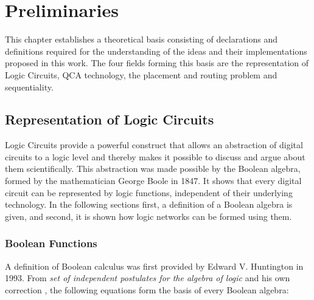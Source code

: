 \chapter{Preliminaries}\label{chapter:Preliminaries}
This chapter establishes a theoretical basis consisting of declarations and definitions required for the understanding of the ideas and their implementations proposed in this work. The four fields forming this basis are the representation of Logic Circuits, QCA technology, the placement and routing problem and sequentiality.

\section{Representation of Logic Circuits}
Logic Circuits provide a powerful construct that allows an abstraction of digital circuits to a logic level and thereby makes it possible to discuss and argue about them scientifically. This abstraction was made possible by the Boolean algebra, formed by the mathematician George Boole in 1847. It shows that every digital circuit can be represented by logic functions, independent of their underlying technology. In the following sections first, a definition of a Boolean algebra is given, and second, it is shown how logic networks can be formed using them.

\subsection{Boolean Functions}\label{subsec:boolfunc}
A definition of Boolean calculus was first provided by Edward V. Huntington in 1993. From \textit{set of independent postulates for the algebra of logic} and his own correction \cite{HuntingtonPostulate, HuntingtonCorrection}, the following equations form the basis of every Boolean algebra:

